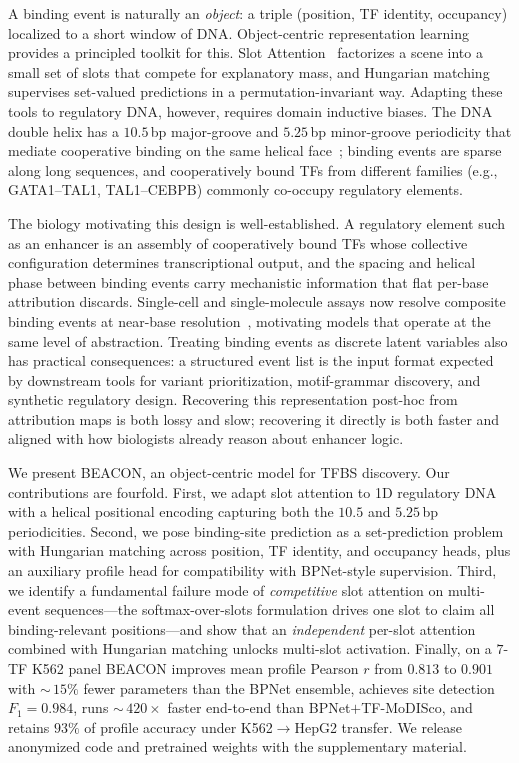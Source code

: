 \documentclass{article}
\begin{document}
A binding event is naturally an \emph{object}: a triple (position, TF identity, occupancy) localized to a short window of DNA. Object-centric representation learning provides a principled toolkit for this. Slot Attention~\citep{locatello2020slotattention} factorizes a scene into a small set of slots that compete for explanatory mass, and Hungarian matching~\citep{carion2020detr} supervises set-valued predictions in a permutation-invariant way. Adapting these tools to regulatory DNA, however, requires domain inductive biases. The DNA double helix has a $10.5$\,bp major-groove and $5.25$\,bp minor-groove periodicity that mediate cooperative binding on the same helical face~\citep{kim2007helical}; binding events are sparse along long sequences, and cooperatively bound TFs from different families (e.g., GATA1--TAL1, TAL1--CEBPB) commonly co-occupy regulatory elements.

The biology motivating this design is well-established. A regulatory element such as an enhancer is an assembly of cooperatively bound TFs whose collective configuration determines transcriptional output, and the spacing and helical phase between binding events carry mechanistic information that flat per-base attribution discards. Single-cell and single-molecule assays now resolve composite binding events at near-base resolution~\citep{rauluseviciute2024jaspar}, motivating models that operate at the same level of abstraction. Treating binding events as discrete latent variables also has practical consequences: a structured event list is the input format expected by downstream tools for variant prioritization, motif-grammar discovery, and synthetic regulatory design. Recovering this representation post-hoc from attribution maps is both lossy and slow; recovering it directly is both faster and aligned with how biologists already reason about enhancer logic.

We present BEACON, an object-centric model for TFBS discovery. Our contributions are fourfold. First, we adapt slot attention to 1D regulatory DNA with a helical positional encoding capturing both the $10.5$ and $5.25$\,bp periodicities. Second, we pose binding-site prediction as a set-prediction problem with Hungarian matching across position, TF identity, and occupancy heads, plus an auxiliary profile head for compatibility with BPNet-style supervision. Third, we identify a fundamental failure mode of \emph{competitive} slot attention on multi-event sequences---the softmax-over-slots formulation drives one slot to claim all binding-relevant positions---and show that an \emph{independent} per-slot attention combined with Hungarian matching unlocks multi-slot activation. Finally, on a $7$-TF K562 panel BEACON improves mean profile Pearson $r$ from $0.813$ to $0.901$ with $\sim$\,$15\%$ fewer parameters than the BPNet ensemble, achieves site detection $F_1{=}0.984$, runs $\sim$\,$420\times$ faster end-to-end than BPNet$+$TF-MoDISco, and retains $93\%$ of profile accuracy under K562$\rightarrow$HepG2 transfer. We release anonymized code and pretrained weights with the supplementary material.
\end{document}
